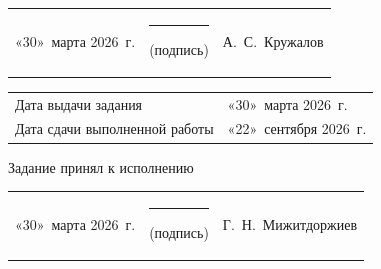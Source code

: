 \documentclass[14pt, a4paper]{extarticle}
\begin{document}
{
\renewcommand{\arraystretch}{2}
\noindent
\begin{tabularx}{\textwidth}{@{} P{0.45\textwidth} P{0.3\textwidth} P{0.25\textwidth} @{}}

    «30»~марта 2026~г. &
    \centering \rule{3.5cm}{0.4pt} \par \footnotesize (подпись) &
    \hfill А.~С.~Кружалов                                         \\
\end{tabularx}
\begin{tabularx}{\textwidth}{@{} P{0.45\textwidth} P{0.55\textwidth} @{}}
    Дата выдачи задания           &
    \hfill «30»~марта 2026~г. \\

    Дата сдачи выполненной работы &
    \hfill «22»~сентября 2026~г. \\
\end{tabularx}
}

Задание принял к исполнению

{
\renewcommand{\arraystretch}{1.5}
\begin{tabularx}{\textwidth}{@{} P{0.45\textwidth} P{0.3\textwidth} P{0.25\textwidth} @{}}

    «30»~марта 2026~г. &
    \centering \rule{3.5cm}{0.4pt} \par \footnotesize (подпись) &
    \hfill Г.~Н.~Мижитдоржиев                                            \\
\end{tabularx}
}
\end{document}
